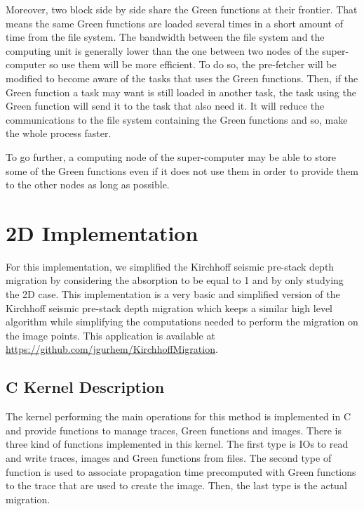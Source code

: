 Moreover, two block side by side share the Green functions at their frontier.
That means the same Green functions are loaded several times in a short amount of time from the file system.
The bandwidth between the file system and the computing unit is generally lower than the one between two nodes of the super-computer so use them will be more efficient.
To do so, the pre-fetcher will be modified to become aware of the tasks that uses the Green functions.
Then, if the Green function a task may want is still loaded in another task, the task using the Green function will send it to the task that also need it.
It will reduce the communications to the file system containing the Green functions and so, make the whole process faster.

To go further, a computing node of the super-computer may be able to store some of the Green functions even if it does not use them in order to provide them to the other nodes as long as possible.

\section{2D Implementation}

For this implementation, we simplified the Kirchhoff seismic pre-stack depth migration by considering the absorption to be equal to 1 and by only studying the 2D case.
This implementation is a very basic and simplified version of the Kirchhoff seismic pre-stack depth migration which keeps a similar high level algorithm while simplifying the computations needed to perform the migration on the image points.
This application is available at \url{https://github.com/jgurhem/KirchhoffMigration}.

\subsection{C Kernel Description}
The kernel performing the main operations for this method is implemented in C and provide functions to manage traces, Green functions and images.
There is three kind of functions implemented in this kernel.
The first type is IOs to read and write traces, images and Green functions from files.
The second type of function is used to associate propagation time precomputed with Green functions to the trace that are used to create the image.
Then, the last type is the actual migration.

